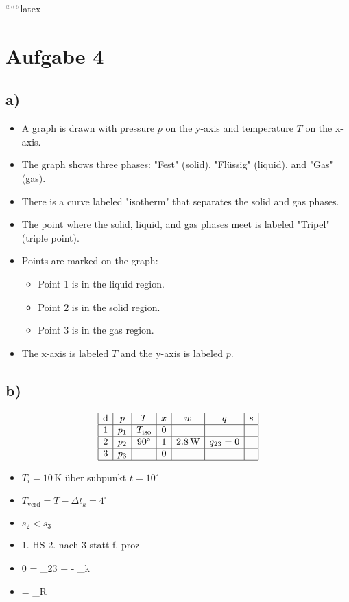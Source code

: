 
``````latex


\section*{Aufgabe 4}

\subsection*{a)}

\begin{itemize}
    \item A graph is drawn with pressure \( p \) on the y-axis and temperature \( T \) on the x-axis.
    \item The graph shows three phases: "Fest" (solid), "Flüssig" (liquid), and "Gas" (gas).
    \item There is a curve labeled "isotherm" that separates the solid and gas phases.
    \item The point where the solid, liquid, and gas phases meet is labeled "Tripel" (triple point).
    \item Points are marked on the graph:
        \begin{itemize}
            \item Point 1 is in the liquid region.
            \item Point 2 is in the solid region.
            \item Point 3 is in the gas region.
        \end{itemize}
    \item The x-axis is labeled \( T \) and the y-axis is labeled \( p \).
\end{itemize}

\subsection*{b)}

\[
\begin{array}{|c|c|c|c|c|c|c|}
\hline
\text{d} & p & T & x & w & q & s \\
\hline
1 & p_1 & T_{\text{iso}} & 0 & & & \\
\hline
2 & p_2 & 90^\circ & 1 & 2.8 \, \text{W} & q_{23}=0 & \\
\hline
3 & p_3 & & 0 & & & \\
\hline
\end{array}
\]

\begin{itemize}
    \item \( T_i = 10 \, \text{K} \) über subpunkt \( t = 10^\circ \)
    \item \( \overline{T}_{\text{verd}} = \overline{T} - \Delta t_k = 4^\circ \)
    \item \( s_2 < s_3 \)
    \item 1. HS 2. nach 3 statt f. proz
    \item 0 = _{23} \left[ h_2 - h_3 \right] +  - _k \quad {}
    \item {} = _R
\end{itemize}


